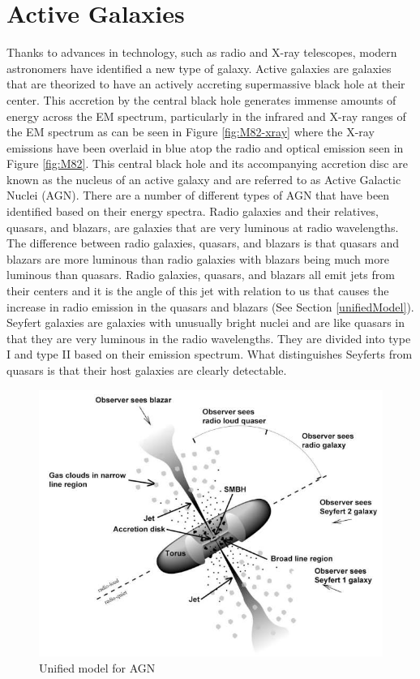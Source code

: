 \documentclass[12pt, oneside]{smuthesis}
\begin{document}
\section{\sc Active Galaxies} \label{activeGalaxies}

Thanks to advances in technology, such as radio and X-ray telescopes, modern astronomers have identified a new type of galaxy. Active galaxies are galaxies that are theorized to have an actively accreting supermassive black hole at their center. This accretion by the central black hole generates immense amounts of energy across the EM spectrum, particularly in the infrared and X-ray ranges of the EM spectrum as can be seen in Figure \ref{fig:M82-xray} where the X-ray emissions have been overlaid in blue atop the radio and optical emission seen in Figure \ref{fig:M82}. This central black hole and its accompanying accretion disc are known as the nucleus of an active galaxy and are referred to as Active Galactic Nuclei (AGN). There are a number of different types of AGN that have been identified based on their energy spectra. Radio galaxies and their relatives, quasars, and blazars, are galaxies that are very luminous at radio wavelengths. The difference between radio galaxies, quasars, and blazars is that quasars and blazars are more luminous than radio galaxies with blazars being much more luminous than quasars. Radio galaxies, quasars, and blazars all emit jets from their centers and it is the angle of this jet with relation to us that causes the increase in radio emission in the quasars and blazars (See Section \ref{unifiedModel}). Seyfert galaxies are galaxies with unusually bright nuclei and are like quasars in that they are very luminous in the radio wavelengths. They are divided into type I and type II based on their emission spectrum. What distinguishes Seyferts from quasars is that their host galaxies are clearly detectable.

\begin{figure}[H]
	\centering
	\includegraphics[width=0.6\linewidth]{UnifiedModel}
	\caption{Unified model for AGN \citep{unifiedmodel}}
	\label{fig:unifiedModel}
\end{figure}
\end{document}
